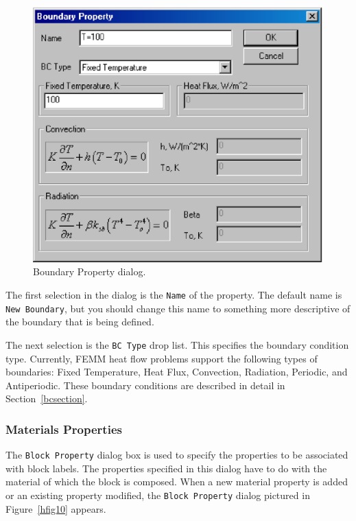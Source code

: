 \begin{figure}[htbp]
\centerline{\includegraphics{hbdryprop.ps}}
\caption{Boundary Property dialog.}
\label{hfig9}
\end{figure}

The first selection in the dialog is the \texttt{Name} of the
property. The default name is {\tt New Boundary}, but you should
change this name to something more descriptive of the boundary that
is being defined.

The next selection is the \texttt{BC Type} drop list. This
specifies the boundary condition type. Currently, FEMM heat flow problems
support the following types of boundaries: Fixed Temperature, Heat Flux, Convection,
Radiation, Periodic, and Antiperiodic. These boundary conditions are
described in detail in Section~\ref{bcsection}.

\subsubsection{Materials Properties}

The \texttt{Block Property} dialog box is used to specify the
properties to be associated with block labels. The properties
specified in this dialog have to do with the material of which the
block is composed. When a new material property is added or an
existing property modified, the
\texttt{Block Property} dialog pictured in Figure~\ref{hfig10} appears.

